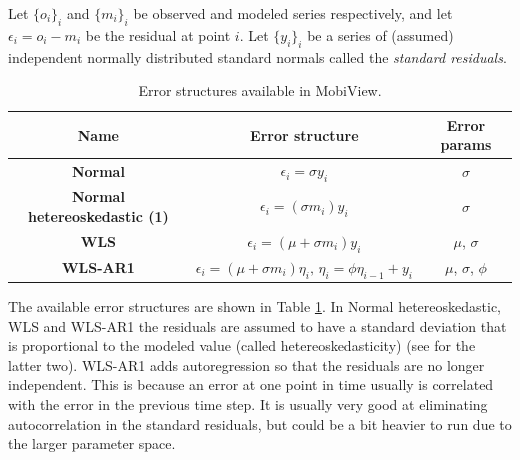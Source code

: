 \documentclass[11pt]{article}
\theoremstyle{definition}
\begin{document}
Let $\{o_i\}_i$ and $\{m_i\}_i$ be observed and modeled series respectively, and let $\epsilon_i=o_i-m_i$ be the residual at point $i$. Let $\{y_i\}_i$ be a series of (assumed) independent normally distributed standard normals called the \emph{standard residuals}.
\begin{table}[h!]
\begin{center}
\begin{tabular}{c  c  c}
\hline
{\bf Name } & {\bf Error structure} & {\bf Error params} \\
\hline
{\bf Normal} & $\epsilon_i = \sigma y_i$ & $\sigma$ \\
{\bf Normal hetereoskedastic (1)} & $\epsilon_i = (\sigma m_i) y_i$ & $\sigma$ \\
{\bf WLS} \cite{evin-et-al14} & $\epsilon_i = (\mu + \sigma m_i) y_i$ & $\mu$, $\sigma$ \\
{\bf WLS-AR1} \cite{evin-et-al14} & $\epsilon_i = (\mu + \sigma m_i)\eta_i,\, \eta_i = \phi\eta_{i-1}+y_i$ & $\mu$, $\sigma$, $\phi$ \\
\hline
\end{tabular}
\caption{Error structures available in MobiView.}
\label{tab:errstruct}
\end{center}
\end{table}

The available error structures are shown in Table \ref{tab:errstruct}. In Normal hetereoskedastic, WLS and WLS-AR1 the residuals are assumed to have a standard deviation that is proportional to the modeled value (called hetereoskedasticity) (see \cite{evin-et-al14} for the latter two). WLS-AR1 adds autoregression so that the residuals are no longer independent. This is because an error at one point in time usually is correlated with the error in the previous time step. It is usually very good at eliminating autocorrelation in the standard residuals, but could be a bit heavier to run due to the larger parameter space.
\end{document}
